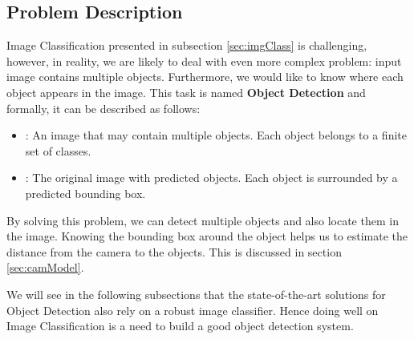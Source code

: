\subsection{Problem Description}
Image Classification presented in subsection \ref{sec:imgClass} is challenging, however, in reality, we are likely to deal with even more complex problem: input image contains multiple objects. Furthermore, we would like to know where each object appears in the image. This task is named \textbf{Object Detection} and formally, it can be described as follows:
\begin{itemize}
	\item {}: An image that may contain multiple objects. Each object belongs to a finite set of classes.
	\item {}: The original image with predicted objects. Each object is surrounded by a predicted bounding box.
\end{itemize}
By solving this problem, we can detect multiple objects and also locate them in the image. Knowing the bounding box around the object helps us to estimate the distance from the camera to the objects. This is discussed in section \ref{sec:camModel}.

We will see in the following subsections that the state-of-the-art solutions for Object Detection also rely on a robust image classifier. Hence doing well on Image Classification is a need to build a good object detection system.

